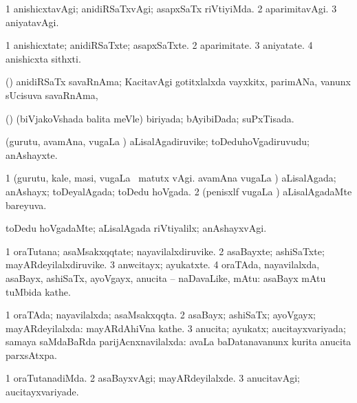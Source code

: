 \bentry
{}
\gl{\kirxvi}
\bmng
\bnum
\num{1} anishicxtavAgi; anidiRSaTxvAgi; asapxSaTx riVtiyiMda. 
\num{2} aparimitavAgi. 
\num{3} aniyatavAgi. 
\enum
\emng
\eentry

\bentry
{}
\gl{\nA}
\bmng
\bnum
\num{1} anishicxtate; anidiRSaTxte; asapxSaTxte. 
\num{2} aparimitate. 
\num{3} aniyatate. 
\num{4} anishicxta sithxti. 
\enum
\emng
\eentry

\bentry
{}
\gl{\nA}
\bmng
(\vAyx) anidiRSaTx savaRnAma; KacitavAgi gotitxlalxda vayxkitx, parimANa, \mo vanunx sUcisuva savaRnAma, \udA\  
\emng
\eentry

\bentry
{}
\gl{\gu}
\bmng
(\savi) (biVjakoVshada \vi balita meVle) biriyada; bAyibiDada; suPxTisada. 
\emng
\eentry

\bentry
{}
\gl{\nA}
\bmng
(gurutu, avamAna, \mo vugaLa \vi) aLisalAgadiruvike; toDeduhoVgadiruvudu; anAshayxte. 
\emng
\eentry

\bentry
{}
\gl{\gu}
\bmng
\bnum
\num{1} (gurutu, kale, masi, \mo vugaLa \vi\ matutx \rUpa vAgi. avamAna \mo vugaLa \vi) aLisalAgada; anAshayx; toDeyalAgada; toDedu hoVgada. 
\num{2} (penisxlf \mo vugaLa \vi) aLisalAgadaMte bareyuva. 
\enum
\emng
\eentry

\bentry
{}
\gl{\kirxvi}
\bmng
toDedu hoVgadaMte; aLisalAgada riVtiyalilx; anAshayxvAgi. 
\emng
\eentry

\bentry
{}
\gl{\nA}
\bmng
\bnum
\num{1} oraTutana; asaMsakxqqtate; nayavilalxdiruvike. 
\num{2} asaBayxte; ashiSaTxte; mayARdeyilalxdiruvike. 
\num{3} anwcitayx; ayukatxte. 
\num{4} oraTAda, nayavilalxda, asaBayx, ashiSaTx, ayoVgayx, anucita -- naDavaLike, mAtu:  asaBayx mAtu tuMbida kathe. 
\enum
\emng
\eentry

\bentry
{}
\gl{\gu}
\bmng
\bnum
\num{1} oraTAda; nayavilalxda; asaMsakxqqta. 
\num{2} asaBayx; ashiSaTx; ayoVgayx; mayARdeyilalxda:  mayARdAhiVna kathe. 
\num{3} anucita; ayukatx; aucitayxvariyada; samaya saMdaBaRda parijAcnxnavilalxda:  avaLa baDatanavanunx kurita anucita parxsAtxpa. 
\enum
\emng
\eentry

\bentry
{}
\gl{\kirxvi}
\bmng
\bnum
\num{1} oraTutanadiMda. 
\num{2} asaBayxvAgi; mayARdeyilalxde. 
\num{3} anucitavAgi; aucitayxvariyade. 
\enum
\emng
\eentry

